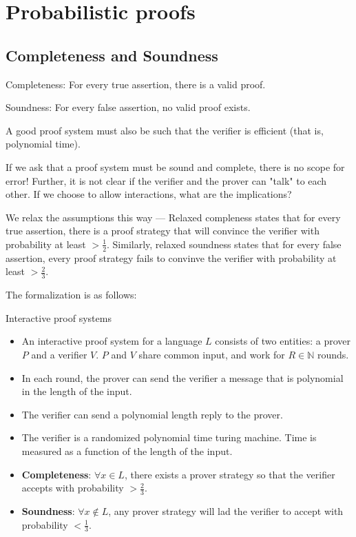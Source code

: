 \chapter{Probabilistic proofs}
\section{Completeness and Soundness}
\begin{definition}
Completeness: For every true assertion, there is a valid proof.
\end{definition}

\begin{definition}
Soundness: For every false assertion, no valid proof exists.
\end{definition}

A good proof system must also be such that the verifier is efficient
(that is, polynomial time).

If we ask that a proof system must be sound and complete, there is no 
scope for error! Further, it is not clear if the verifier and the
prover can "talk" to each other. If we choose to allow interactions, what
are the implications?


We relax the assumptions this way --- Relaxed compleness states that
for every true assertion, there is a
proof strategy that will convince the verifier with probability 
at least $> \frac{1}{2}$.  
Similarly, relaxed soundness states that for every false assertion,
every proof strategy fails to convinve the verifier with probability
at least $> \frac{2}{3}$. 

The formalization is as follows:
\begin{definition}
Interactive proof systems
\begin{itemize}
\item An interactive proof system for a language $L$ consists of two
entities: a prover $P$ and a verifier $V$.
$P$ and $V$ share common input, and work for $R \in \mathbb{N}$ rounds.

\item In each round, the prover can send the verifier a message that 
is polynomial in the length of the input.

\item The verifier can send a polynomial length reply to the prover.

\item The verifier is a randomized polynomial time turing machine. Time
is measured as a function of the length of the input.

\item \textbf{Completeness}: $\forall x \in L$, there exists a prover strategy
so that the verifier accepts with probability $> \frac{2}{3}$.

\item \textbf{Soundness}: $\forall x \notin L$, any prover strategy will lad
the verifier to accept with probability  $< \frac{1}{3}$.
\end{itemize}
\end{definition}
